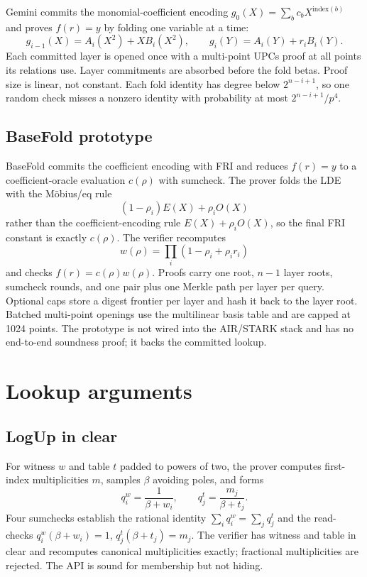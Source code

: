 \documentclass[11pt,a4paper]{article}
\begin{document}
Gemini commits the monomial-coefficient encoding
$g_0(X)=\sum_bc_bX^{\mathrm{index}(b)}$ and proves $f(r)=y$ by folding one
variable at a time:
\[
g_{i-1}(X)=A_i(X^2)+XB_i(X^2),\qquad
g_i(Y)=A_i(Y)+r_iB_i(Y).
\]
Each committed layer is opened once with a multi-point UPCs proof at all
points its relations use. Layer commitments are absorbed before the fold
betas. Proof size is linear, not constant. Each fold identity has degree below
$2^{n-i+1}$, so one random check misses a nonzero identity with probability at
most $2^{n-i+1}/p^4$.

\subsection{BaseFold prototype}

BaseFold commits the coefficient encoding with FRI and reduces $f(r)=y$ to a
coefficient-oracle evaluation $c(\rho)$ with sumcheck. The prover folds the
LDE with the M\"obius/eq rule
\[
(1-\rho_i)E(X)+\rho_iO(X)
\]
rather than the coefficient-encoding rule $E(X)+\rho_iO(X)$, so the final FRI
constant is exactly $c(\rho)$. The verifier recomputes
\[
w(\rho)=\prod_i(1-\rho_i+\rho_ir_i)
\]
and checks $f(r)=c(\rho)w(\rho)$. Proofs carry one root, $n-1$ layer roots,
sumcheck rounds, and one pair plus one Merkle path per layer per query.
Optional caps store a digest frontier per layer and hash it back to the layer
root. Batched multi-point openings use the multilinear basis table and are
capped at 1024 points. The prototype is not wired into the AIR/STARK stack
and has no end-to-end soundness proof; it backs the committed lookup.

\section{Lookup arguments}

\subsection{LogUp in clear}

For witness $w$ and table $t$ padded to powers of two, the prover computes
first-index multiplicities $m$, samples $\beta$ avoiding poles, and forms
\[
q^w_i=\frac{1}{\beta+w_i},\qquad
q^t_j=\frac{m_j}{\beta+t_j}.
\]
Four sumchecks establish the rational identity
$\sum_iq^w_i=\sum_jq^t_j$ and the read-checks
$q^w_i(\beta+w_i)=1$, $q^t_j(\beta+t_j)=m_j$. The verifier has witness and
table in clear and recomputes canonical multiplicities exactly; fractional
multiplicities are rejected. The API is sound for membership but not hiding.
\end{document}
